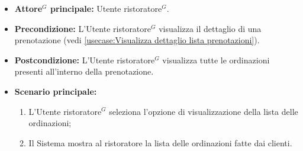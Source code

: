 \label{usecase:Visualizzazione lista ordinazioni}
\begin{itemize}
	\item \textbf{\gls{Attore}$^G$ principale:} \gls{Utente ristoratore}$^G$.

	\item \textbf{Precondizione:} L'\gls{Utente ristoratore}$^G$ visualizza il dettaglio di una prenotazione (vedi \autoref{usecase:Visualizza dettaglio lista prenotazioni}).

	\item \textbf{Postcondizione:} L'\gls{Utente ristoratore}$^G$ visualizza tutte le
	      ordinazioni presenti all'interno della prenotazione.

	\item \textbf{Scenario principale:}
	      \begin{enumerate}
		      \item L'\gls{Utente ristoratore}$^G$ seleziona l'opzione di visualizzazione della lista delle ordinazioni;

		      \item Il Sistema mostra al ristoratore la lista delle ordinazioni fatte dai clienti.
	      \end{enumerate}
\end{itemize}
